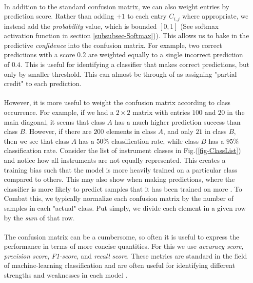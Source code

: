 \documentclass[12pt,letterpaper]{article}
\begin{document}
\paragraph*{}In addition to the standard confusion matrix, we can also weight entries by prediction score. Rather than adding $+1$ to each entry $C_{i,j}$ where appropriate, we instead add the \textit{probability} value, which is bounded $[0,1]$ (See softmax activation function in section \ref{subsubsec-Softmax})). This allows us to bake in the predictive \textit{confidence} into the confusion matrix. For example, two correct predictions with a score $0.2$ are weighted equally to a single incorrect prediction of $0.4$. This is useful for identifying a classifier that makes correct predictions, but only by smaller threshold. This can almost be through of as assigning "partial credit" to each prediction.

\paragraph*{}However, it is more useful to weight the confusion matrix according to class occurrence. For example, if we had a $2 \times 2$ matrix with entries $100$ and $20$ in the main diagonal, it seems that class $A$ has a much higher prediction success than class $B$. However, if there are $200$ elements in class $A$, and only $21$ in class $B$, then we see that class $A$ has a $50\%$ classification rate, while class $B$ has a $95\%$ classification rate. Consider the list of instrument classes in Fig.(\ref{fig-ClassList}) and notice how all instruments are not equally represented. This creates a training bias such that the model is more heavily trained on a particular class compared to others. This may also show when making predictions, where the classifier is more likely to predict samples that it has been trained on more \cite{James,Loy}. To Combat this, we typically normalize each confusion matrix by the number of samples in each "actual" class. Put simply, we divide each element in a given row by the \textit{sum} of that row.

\paragraph*{}The confusion matrix can be a cumbersome, so often it is useful to express the performance in terms of more concise quantities. For this we use \textit{accuracy score}, \textit{precision score}, \textit{F1-score}, and \textit{recall score}. These metrics are standard in the field of machine-learning classification and are often useful for identifying different strengths and weaknesses in each model \cite{Geron,James}.
\end{document}
